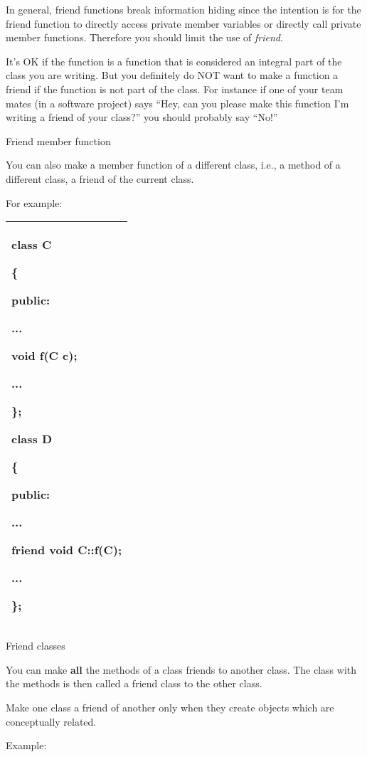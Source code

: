 \documentclass[
]{article}
\begin{document}
In general, friend functions break information hiding since the
intention is for the friend function to directly access private member
variables or directly call private member functions. Therefore you
should limit the use of \emph{friend}.

It's OK if the function is a function that is considered an integral
part of the class you are writing. But you definitely do NOT want to
make a function a friend if the function is not part of the class. For
instance if one of your team mates (in a software project) says ``Hey,
can you please make this function I'm writing a friend of your class?''
you should probably say ``No!''

Friend member function

You can also make a member function of a different class, i.e., a method
of a different class, a friend of the current class.

For example:

\begin{longtable}[]{@{}l@{}}
\toprule
\endhead
\begin{minipage}[t]{0.97\columnwidth}\raggedright
class C

\{

public:

...

void f(C c);

...

\};

class D

\{

public:

...

friend void C::f(C);

...

\};\strut
\end{minipage}\tabularnewline
\bottomrule
\end{longtable}

Friend classes

You can make \textbf{all} the methods of a class friends to another
class. The class with the methods is then called a friend class to the
other class.

Make one class a friend of another only when they create objects which
are conceptually related.

Example:
\end{document}
